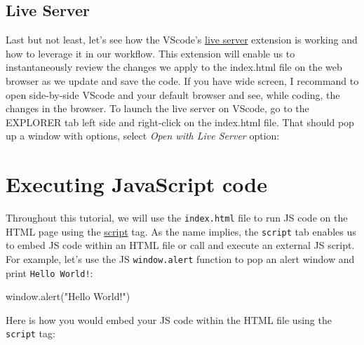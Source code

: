 \documentclass[
  letterpaper,
  DIV=11,
  numbers=noendperiod]{scrreprt}
\newenvironment{Shaded}{\begin{snugshade}}{\end{snugshade}}
\newcommand{\BuiltInTok}[1]{\textcolor[rgb]{0.00,0.23,0.31}{#1}}
\newcommand{\FunctionTok}[1]{\textcolor[rgb]{0.28,0.35,0.67}{#1}}
\newcommand{\NormalTok}[1]{\textcolor[rgb]{0.00,0.23,0.31}{#1}}
\newcommand{\OperatorTok}[1]{\textcolor[rgb]{0.37,0.37,0.37}{#1}}
\newcommand{\StringTok}[1]{\textcolor[rgb]{0.13,0.47,0.30}{#1}}
\begin{document}
\hypertarget{live-server}{%
\subsection{Live Server}\label{live-server}}

Last but not least, let's see how the VScode's
\href{https://marketplace.visualstudio.com/items?itemName=ritwickdey.LiveServer}{live
server} extension is working and how to leverage it in our workflow.
This extension will enable us to instantaneously review the changes we
apply to the index.html file on the web browser as we update and save
the code. If you have wide screen, I recommand to open side-by-side
VScode and your default browser and see, while coding, the changes in
the browser. To launch the live server on VScode, go to the EXPLORER tab
left side and right-click on the index.html file. That should pop up a
window with options, select \emph{Open with Live Server} option:

\hypertarget{executing-javascript-code}{%
\section{Executing JavaScript code}\label{executing-javascript-code}}

Throughout this tutorial, we will use the \texttt{index.html} file to
run JS code on the HTML page using the
\href{https://www.w3schools.com/tags/tag_script.asp}{script} tag. As the
name implies, the \texttt{script} tab enables us to embed JS code within
an HTML file or call and execute an external JS script. For example,
let's use the JS \texttt{window.alert} function to pop an alert window
and print \texttt{Hello\ World!}:

\begin{Shaded}
\begin{Highlighting}[]
\BuiltInTok{window}\OperatorTok{.}\FunctionTok{alert}\NormalTok{(}\StringTok{"Hello World!"}\NormalTok{)}
\end{Highlighting}
\end{Shaded}

Here is how you would embed your JS code within the HTML file using the
\texttt{script} tag:
\end{document}
